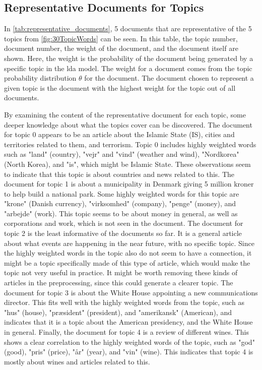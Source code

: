 \subsection{Representative Documents for Topics}
In \autoref{tab:representative_documents}, 5 documents that are representative of the 5 topics from \autoref{fig:30TopicWords} can be seen.
In this table, the topic number, document number, the weight of the document, and the document itself are shown.
Here, the weight is the probability of the document being generated by a specific topic in the \gls{lda} model.
The weight for a document comes from the topic probability distribution $\theta$ for the document.
The document chosen to represent a given topic is the document with the highest weight for the topic out of all documents.

By examining the content of the representative document for each topic, some deeper knowledge about what the topics cover can be discovered.
The document for topic 0 appears to be an article about the Islamic State (IS), cities and territories related to them, and terrorism.
Topic 0 includes highly weighted words such as "land" (country), "vejr" and "vind" (weather and wind), "Nordkorea" (North Korea), and "is", which might be Islamic State.
These observations seem to indicate that this topic is about countries and news related to this.
The document for topic 1 is about a municipality in Denmark giving 5 million kroner to help build a national park.
Some highly weighted words for this topic are "krone" (Danish currency), "virksomhed" (company), "penge" (money), and "arbejde" (work).
This topic seems to be about money in general, as well as corporations and work, which is not seen in the document.
The document for topic 2 is the least informative of the documents so far.
It is a general article about what events are happening in the near future, with no specific topic.
Since the highly weighted words in the topic also do not seem to have a connection, it might be a topic specifically made of this type of article, which would make the topic not very useful in practice.
It might be worth removing these kinds of articles in the preprocessing, since this could generate a clearer topic.
The document for topic 3 is about the White House appointing a new communications director.
This fits well with the highly weighted words from the topic, such as "hus" (house), "præsident" (president), and "amerikansk" (American), and indicates that it is a topic about the American presidency, and the White House in general.
Finally, the document for topic 4 is a review of different wines.
This shows a clear correlation to the highly weighted words of the topic, such as "god" (good), "pris" (price), "år" (year), and "vin" (wine).
This indicates that topic 4 is mostly about wines and articles related to this.


